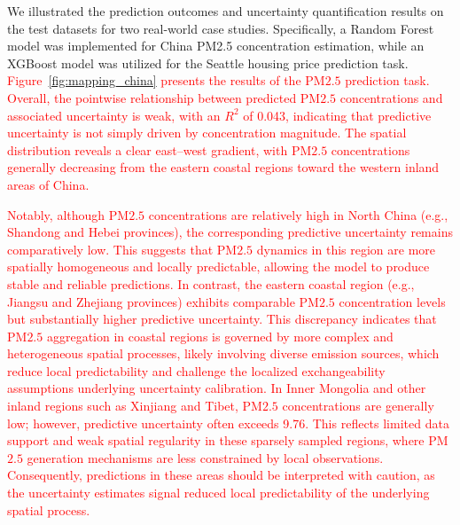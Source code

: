 \documentclass[authoryear,preprint,review,12pt]{elsarticle}
\begin{document}

We illustrated the prediction outcomes and uncertainty quantification results on the test datasets for two real-world case studies. Specifically, a Random Forest model was implemented for China PM2.5 concentration estimation, while an XGBoost model was utilized for the Seattle housing price prediction task. \textcolor{red}{Figure~\ref{fig:mapping_china} presents the results of the PM${2.5}$ prediction task. Overall, the pointwise relationship between predicted PM${2.5}$ concentrations and associated uncertainty is weak, with an $R^{2}$ of 0.043, indicating that predictive uncertainty is not simply driven by concentration magnitude. The spatial distribution reveals a clear east–west gradient, with PM${2.5}$ concentrations generally decreasing from the eastern coastal regions toward the western inland areas of China. }

\textcolor{red}{Notably, although PM${2.5}$ concentrations are relatively high in North China (e.g., Shandong and Hebei provinces), the corresponding predictive uncertainty remains comparatively low. This suggests that PM${2.5}$ dynamics in this region are more spatially homogeneous and locally predictable, allowing the model to produce stable and reliable predictions. In contrast, the eastern coastal region (e.g., Jiangsu and Zhejiang provinces) exhibits comparable PM${2.5}$ concentration levels but substantially higher predictive uncertainty. This discrepancy indicates that PM${2.5}$ aggregation in coastal regions is governed by more complex and heterogeneous spatial processes, likely involving diverse emission sources, which reduce local predictability and challenge the localized exchangeability assumptions underlying uncertainty calibration.
In Inner Mongolia and other inland regions such as Xinjiang and Tibet, PM${2.5}$ concentrations are generally low; however, predictive uncertainty often exceeds 9.76. This reflects limited data support and weak spatial regularity in these sparsely sampled regions, where PM${2.5}$ generation mechanisms are less constrained by local observations. Consequently, predictions in these areas should be interpreted with caution, as the uncertainty estimates signal reduced local predictability of the underlying spatial process.}
\end{document}
